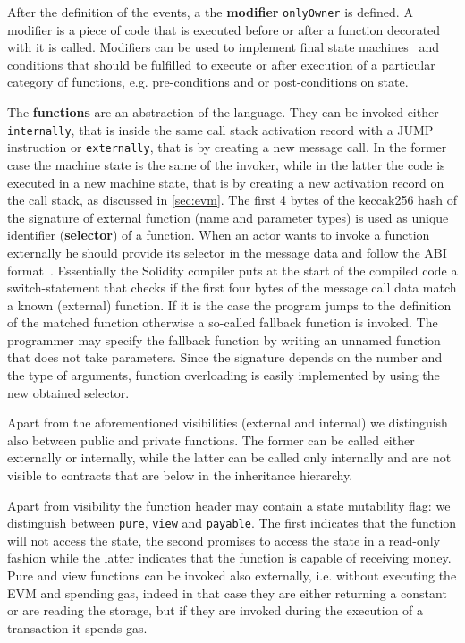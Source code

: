 After the definition of the events, a the \textbf{modifier} \verb|onlyOwner| is
defined. A modifier is a piece of code that is executed before or after a 
function decorated with it is called. Modifiers can be used to implement final
state machines~\cite{bib:solidity-docs} and conditions that should be fulfilled 
to execute or after execution of a particular category of functions, e.g. 
pre-conditions and or post-conditions on state.

The \textbf{functions} are an abstraction of the language. They can be invoked 
either  \texttt{internally}, that is inside the same call stack activation 
record with a JUMP instruction or \texttt{externally}, that is by creating a
new message  call. In the former case the machine state is the same of the
invoker, while in the latter the code is executed in a new machine state, that is by creating a new activation record on the call stack, as discussed in
\autoref{sec:evm}.
The first 4 bytes of the keccak256 hash of the signature of external function
(name and parameter types) is used as unique identifier (\textbf{selector}) of
a function. When an actor wants to invoke a function externally he should 
provide its selector in the message data and follow the ABI
format~\cite{bib:solidity-docs}.
Essentially the Solidity compiler puts at the start of the compiled code a
switch-statement that checks if the first four bytes of the message call data
match a known (external) function. If it is the case the program jumps to the
definition of the matched function otherwise a so-called fallback function is 
invoked.
The programmer may specify the fallback function by writing an unnamed function
that does not take parameters. Since the signature depends on the number and
the type of arguments, function overloading is easily implemented by using
the new obtained selector.

Apart from the aforementioned visibilities (external and internal)
we distinguish also between public and private functions. The former can be
called either externally or internally, while the latter can be called only 
internally and are not visible to contracts that are below in the inheritance
hierarchy.

Apart from visibility the function header may contain a state mutability flag:
we distinguish between \texttt{pure}, \texttt{view} and \texttt{payable}. 
The first indicates that the function will not access the state, the second
promises to access the state in a read-only fashion while the latter indicates 
that the function is capable of receiving money.
Pure and view functions can be invoked also externally, i.e. without executing
the EVM and spending gas, indeed in that case they are either returning a
constant or are reading the storage, but if they are invoked during the
execution of a transaction it spends gas.




